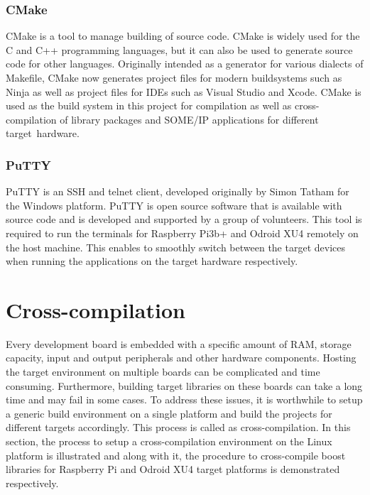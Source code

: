 \subsubsection{CMake}
CMake is a tool to manage building of source code\cite{b_CMake}. CMake is widely used for the C and C++ programming languages, but it can also be used to generate source code for other languages\cite{b_CMake}. Originally intended as a generator for various dialects of Makefile, CMake now generates project files for modern buildsystems such as Ninja as well as project files for IDEs such as Visual Studio and Xcode\cite{b_CMake}. CMake is used as the build system in this project for compilation as well as cross-compilation of library packages and SOME/IP applications for different target hardware.

\subsubsection{PuTTY}
PuTTY is an SSH and telnet client, developed originally by Simon Tatham for the Windows platform\cite{b_putty}. PuTTY is open source software that is available with source code and is developed and supported by a group of volunteers\cite{b_putty}. This tool is required to run the terminals for Raspberry Pi3b+ and Odroid XU4 remotely on the host machine. This enables to smoothly switch between the target devices when running the applications on the target hardware respectively.

\section{Cross-compilation}
Every development board is embedded with a specific amount of RAM, storage capacity, input and output peripherals and other hardware components. Hosting the target environment on multiple boards can be complicated and time consuming. Furthermore, building target libraries on these boards can take a long time and may fail in some cases. To address these issues, it is worthwhile to setup a generic build environment on a single platform and build the projects for different targets accordingly. This process is called as cross-compilation. In this section, the process to setup a cross-compilation environment on the Linux platform is illustrated and along with it, the procedure to cross-compile boost libraries for Raspberry Pi and Odroid XU4 target platforms is demonstrated respectively.

